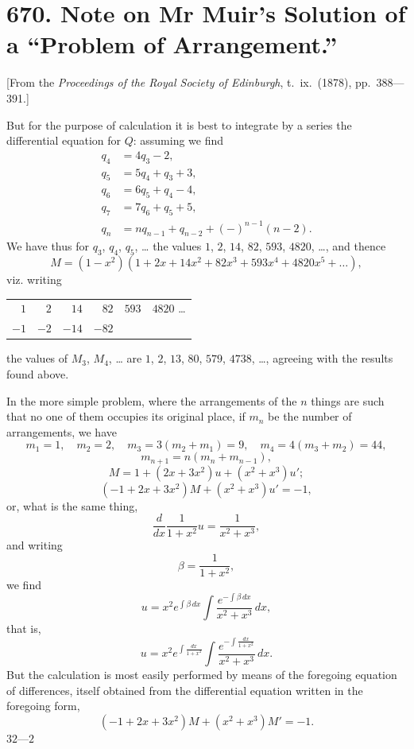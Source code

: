 \documentclass[11pt,a4paper]{book}
\begin{document}
\newpage


\section*{670. Note on Mr Muir's Solution of a ``Problem of Arrangement.''}

[From the \textit{Proceedings of the Royal Society of Edinburgh}, t.\ ix.\ (1878), pp.\ 388---391.]

\vspace{0.5em}
\noindent
But for the purpose of calculation it is best to integrate by a series the differential equation for $Q$: assuming we find
\begin{align*}
q_4 &= 4q_3 - 2,\\
q_5 &= 5q_4 + q_3 + 3,\\
q_6 &= 6q_5 + q_4 - 4,\\
q_7 &= 7q_6 + q_5 + 5,\\
q_n &= nq_{n-1} + q_{n-2} + (-)^{n-1}(n-2).
\end{align*}
We have thus for $q_3$, $q_4$, $q_5$, \dots{} the values $1$, $2$, $14$, $82$, $593$, $4820$, \dots{}, and thence
\[
M = (1 - x^2)(1 + 2x + 14x^2 + 82x^3 + 593x^4 + 4820x^5 + \dots),
\]
viz. writing
\begin{center}
\begin{tabular}{rrrrrr}
$1$ & $2$ & $14$ & $82$ & $593$ & $4820$ \dots\\
$-1$ & $-2$ & $-14$ & $-82$
\end{tabular}
\end{center}
the values of $M_3$, $M_4$, \dots{} are $1$, $2$, $13$, $80$, $579$, $4738$, \dots{}, agreeing with the results found above.

In the more simple problem, where the arrangements of the $n$ things are such that no one of them occupies its original place, if $m_n$ be the number of arrangements, we have
\[
m_1 = 1, \quad m_2 = 2, \quad m_3 = 3(m_2 + m_1) = 9, \quad m_4 = 4(m_3 + m_2) = 44,
\]
\[
m_{n+1} = n(m_n + m_{n-1}),
\]
\[
M = 1 + (2x + 3x^2)u + (x^2 + x^3)u';
\]
\[
(-1 + 2x + 3x^2)M + (x^2 + x^3)u' = -1,
\]
or, what is the same thing,
\[
\frac{d}{dx}\frac{1}{1+x^2}u = \frac{1}{x^2+x^3},
\]
and writing
\[
\beta = \frac{1}{1+x^2},
\]
we find
\[
u = x^2 e^{\int \beta \, dx} \int \frac{e^{-\int \beta \, dx}}{x^2+x^3} \, dx,
\]
that is,
\[
u = x^2 e^{\int \frac{dx}{1+x^2}} \int \frac{e^{-\int \frac{dx}{1+x^2}}}{x^2+x^3} \, dx.
\]
But the calculation is most easily performed by means of the foregoing equation of differences, itself obtained from the differential equation written in the foregoing form,
\[
(-1 + 2x + 3x^2)M + (x^2 + x^3)M' = -1.
\]
\hfill $32\text{---}2$
\end{document}
